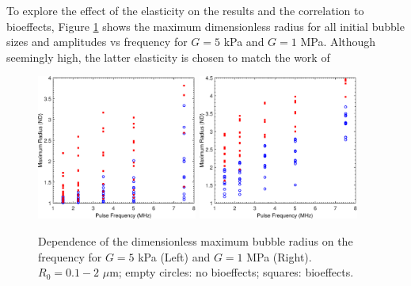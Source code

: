 To explore the effect of the elasticity on the results and the
correlation to bioeffects, Figure \ref{fig:freq_tissue} shows the
maximum dimensionless radius for all initial bubble sizes and
amplitudes vs frequency for $G=5$ kPa and $G=1$ MPa. Although
seemingly high, the latter elasticity is chosen to match the work of
\begin{figure}%
  \includegraphics[width=0.47\textwidth]{./figs/bubble_figs/rstarmax_f_ca=20}
  \includegraphics[width=0.47\textwidth]{./figs/bubble_figs/rstarmax_f_ca=0,1}    
  \caption[Dependence of the dimensionless maximum bubble radius on
  the ultrasound frequency]{ Dependence of the dimensionless maximum
    bubble radius on the frequency for $G=5$ kPa (Left) and $G=1$ MPa
    (Right). $R_0=0.1-2$ $\mu$m; empty circles: no bioeffects;
    squares: bioeffects. }
  \label{fig:freq_tissue}
\end{figure}

\clearpage
\pagebreak
